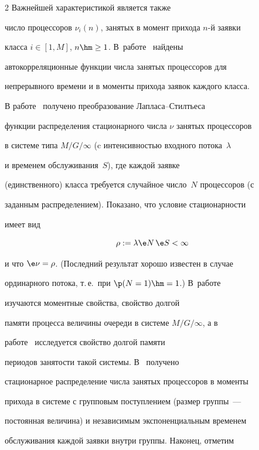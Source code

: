 \begin{multicols}{2}
Важнейшей характеристикой является также

 число процессоров $\nu_{i}(n)$, занятых в момент прихода $n$-й заявки

класса $i\in[1,M]$, $n\hm\ge 1$. В~работе~\cite{liu-templeton} найдены

автокорреляционные функции числа занятых процессоров для

непрерывного времени и  в моменты прихода заявок каждого класса.



 В работе~\cite{tihonenko}  получено  преобразование Лап\-ла\-са--Стил\-ть\-еса

функции распределения стационарного числа $\nu$ занятых процессоров

в системе типа $M/G/\infty$ (c интенсивностью входного потока~$\lambda$  

и временем обслуживания~$S$), где каждой заявке

(единственного) класса требуется случайное  чис\-ло~$N$ процессоров (с

заданным распределением). Показано,  что  условие стационарности

имеет вид

\begin{equation}

\label{tihon1}

    \rho:=\lambda \e N\, \e S<\infty

\end{equation}

и что  $\e\nu =\rho$. (Последний  результат хорошо известен в случае

ординарного потока, т.\,е.\ при $\p(N=1)\hm=1$.) В~работе~\cite{eliazar}

изучаются моментные свойства,  свойство долгой

памяти  процесса величины очереди в системе $M/G/\infty$, а в

работе~\cite{daley-busy} исследуется  свойство долгой памяти

периодов занятости такой системы. В~\cite{brandt} получено

стационарное распределение  числа занятых процессоров в моменты

прихода в системе с групповым поступлением (размер группы~---

постоянная величина) и  независимым экспоненциальным временем

обслуживания каждой заявки внутри группы. Наконец, отметим


\end{multicols}
